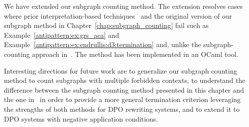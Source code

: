 We have extended our subgraph counting method.
The extension resolves cases where prior interpretation-based techniques~\cite{zantema2014termination,bruggink2014termination,bruggink2015proving,endrullis2024generalized_arxiv_v2,overbeek2024termination_lmcs}
and the original version of our subgraph method in Chapter~\ref{chap:subgraph_counting}
fail such as Example~\ref{antipattern:ex:grs_aca} and Example~\ref{antipattern:ex:endrullis:d3:termination} and, unlike the subgraph-counting approach in~\cite{overbeek2024termination_lmcs}.
The method has been implemented in an OCaml tool.

Interesting directions for future work are to generalize our subgraph counting method to count subgraphs with multiple forbidden contexts, to understand the difference between the subgraph counting method presented in this chapter and the one in~\cite{overbeek2024termination_lmcs} in order to provide a more general termination criterion leveraging the strengths of both methods for DPO rewriting systems, and to extend it to DPO systems with negative application conditions.